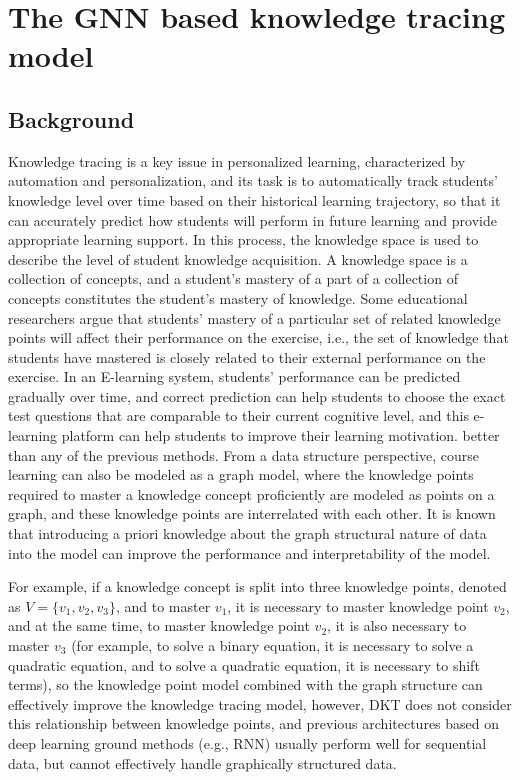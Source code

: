 \documentclass[11pt,en]{elegantpaper}
\begin{document}
\clearpage
\section{The GNN based knowledge tracing model}
\subsection{Background}
Knowledge tracing is a key issue in personalized learning, characterized by automation and personalization, and its task is to automatically track students' knowledge level over time based on their historical learning trajectory, so that it can accurately predict how students will perform in future learning and provide appropriate learning support. In this process, the knowledge space is used to describe the level of student knowledge acquisition. A knowledge space is a collection of concepts, and a student's mastery of a part of a collection of concepts constitutes the student's mastery of knowledge. Some educational researchers argue that students' mastery of a particular set of related knowledge points will affect their performance on the exercise, i.e., the set of knowledge that students have mastered is closely related to their external performance on the exercise. In an E-learning system, students' performance can be predicted gradually over time, and correct prediction can help students to choose the exact test questions that are comparable to their current cognitive level, and this e-learning platform can help students to improve their learning motivation. better than any of the previous methods. From a data structure perspective, course learning can also be modeled as a graph model, where the knowledge points required to master a knowledge concept proficiently are modeled as points on a graph, and these knowledge points are interrelated with each other. It is known that introducing a priori knowledge about the graph structural nature of data into the model can improve the performance and interpretability of the model.

For example, if a knowledge concept is split into three knowledge points, denoted as $V=\{v_1,v_2,v_3\}$, and to master $v_1$, it is necessary to master knowledge point $v_2$, and at the same time, to master knowledge point $v_2$, it is also necessary to master $v_3$ (for example, to solve a binary equation, it is necessary to solve a quadratic equation, and to solve a quadratic equation, it is necessary to shift terms), so the knowledge point model combined with the graph structure can effectively improve the knowledge tracing model, however, DKT does not consider this relationship between knowledge points, and previous architectures based on deep learning ground methods (e.g., RNN) usually perform well for sequential data, but cannot effectively handle graphically structured data.
\end{document}
